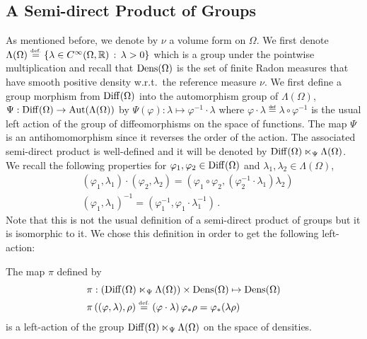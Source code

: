 \subsection{A Semi-direct Product of Groups}
As mentioned before, we denote by $\nu$ a volume form on $\Omega$.
We first denote $\Lambda(\Omega) \stackrel{\mbox{\upshape\tiny def.}}{=} \{ \lambda \in C^\infty(\Omega,\mathbb{R}) \, : \, \lambda > 0 \}$ which is a group under the pointwise multiplication and recall that $\operatorname{Dens}(\Omega)$ is the set of finite Radon measures that have smooth positive density w.r.t.\ the reference measure $\nu$.
We first define a group morphism from $\operatorname{Diff}(\Omega)$ into the automorphism group of $\Lambda(\Omega) $, $\Psi : \operatorname{Diff}(\Omega) \rightarrow \operatorname{Aut}(\Lambda(\Omega))$ by $\Psi(\varphi): \lambda \mapsto \varphi^{-1} \cdot \lambda  $ where $ \varphi \cdot \lambda \eqdef \lambda \circ \varphi^{-1}$ is the usual left action of the group of diffeomorphisms on the space of functions. 
The map $\Psi$ is an antihomomorphism since it reverses the order of the action. 
The associated semi-direct product is well-defined and it will be denoted by $\operatorname{Diff}(\Omega) \ltimes_\Psi \Lambda(\Omega)$. 
We  recall the following properties for $\varphi_1,\varphi_2 \in \operatorname{Diff}(\Omega)$ and $\lambda_1,\lambda_2 \in \Lambda(\Omega)$,
\begin{align}
&(\varphi_1,\lambda_1) \cdot (\varphi_2,\lambda_2) = (\varphi_1\circ \varphi_2,( \varphi_2^{-1} \cdot \lambda_1) \lambda_2 )\\
&(\varphi_1,\lambda_1)^{-1} = (\varphi_1^{-1}, \varphi_1 \cdot \lambda_1^{-1})\,.
\end{align}
Note that this is not the usual definition of a semi-direct product of groups but it is isomorphic to it. We chose this definition in order to get the following left-action:

\begin{proposition}
 The map $\pi$ defined by 
\begin{align*}& \pi: \left( \operatorname{Diff}(\Omega) \ltimes_\Psi \Lambda(\Omega) \right) \times \operatorname{Dens}(\Omega) \mapsto \operatorname{Dens}(\Omega) \\
&\pi\left((\varphi,\lambda) , \rho \right) \stackrel{\mbox{\upshape\tiny def.}}{=} (\varphi \cdot \lambda) \, \varphi_*\rho = \varphi_* (\lambda \rho)
\end{align*}
is a left-action of the group $\operatorname{Diff}(\Omega) \ltimes_\Psi \Lambda(\Omega)$ on the space of densities.
\end{proposition}
 
